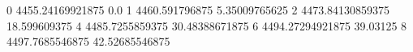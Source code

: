 0 4455.24169921875 0.0
1 4460.591796875 5.35009765625
2 4473.84130859375 18.599609375
4 4485.7255859375 30.48388671875
6 4494.27294921875 39.03125
8 4497.7685546875 42.52685546875
